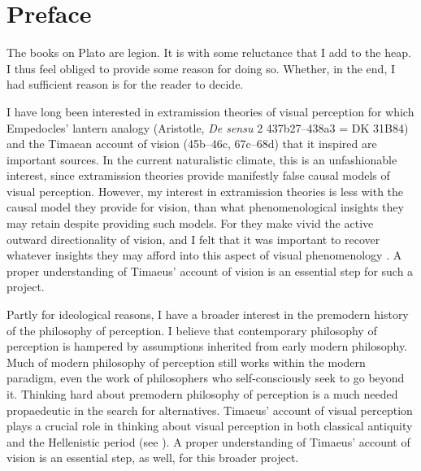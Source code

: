 \chapter*{Preface} %
\label{cha:preface}

The books on Plato are legion. It is with some reluctance that I add to the heap. I thus feel obliged to provide some reason for doing so. Whether, in the end, I had sufficient reason is for the reader to decide.

I have long been interested in extramission theories of visual perception for which Empedocles' lantern analogy (Aristotle, \emph{De sensu} 2 437b27–438a3 = DK 31B84) and the Timaean account of vision (45b–46c, 67c–68d) that it inspired are important sources. In the current naturalistic climate, this is an unfashionable interest, since extramission theories provide manifestly false causal models of visual perception. However, my interest in extramission theories is less with the causal model they provide for vision, than what phenomenological insights they may retain despite providing such models. For they make vivid the active outward directionality of vision, and I felt that it was important to recover whatever insights they may afford into this aspect of visual phenomenology \cite[see][chapter 5, for an initial attempt]{Kalderon:2018oe}. A proper understanding of Timaeus' account of vision is an essential step for such a project.

Partly for ideological reasons, I have a broader interest in the premodern history of the philosophy of perception. I believe that contemporary philosophy of perception is hampered by assumptions inherited from early modern philosophy. Much of modern philosophy of perception still works within the modern paradigm, even the work of philosophers who self-consciously seek to go beyond it. Thinking hard about premodern philosophy of perception is a much needed propaedeutic in the search for alternatives. Timaeus' account of visual perception plays a crucial role in thinking about visual perception in both classical antiquity and the Hellenistic period (see \citealt[chapter 1]{Lindberg:1977aa}). A proper understanding of Timaeus' account of vision is an essential step, as well, for this broader project.

